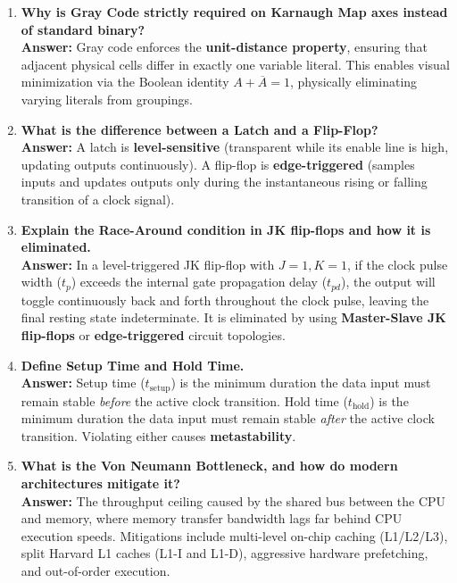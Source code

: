 \begin{enumerate}[label=\bfseries Q\arabic*.]
    \item \textbf{Why is Gray Code strictly required on Karnaugh Map axes instead of standard binary?} \\
    \textbf{Answer:} Gray code enforces the \textbf{unit-distance property}, ensuring that adjacent physical cells differ in exactly one variable literal. This enables visual minimization via the Boolean identity $A + \overline{A} = 1$, physically eliminating varying literals from groupings.

    \item \textbf{What is the difference between a Latch and a Flip-Flop?} \\
    \textbf{Answer:} A latch is \textbf{level-sensitive} (transparent while its enable line is high, updating outputs continuously). A flip-flop is \textbf{edge-triggered} (samples inputs and updates outputs only during the instantaneous rising or falling transition of a clock signal).

    \item \textbf{Explain the Race-Around condition in JK flip-flops and how it is eliminated.} \\
    \textbf{Answer:} In a level-triggered JK flip-flop with $J=1, K=1$, if the clock pulse width ($t_p$) exceeds the internal gate propagation delay ($t_{pd}$), the output will toggle continuously back and forth throughout the clock pulse, leaving the final resting state indeterminate. It is eliminated by using \textbf{Master-Slave JK flip-flops} or \textbf{edge-triggered} circuit topologies.

    \item \textbf{Define Setup Time and Hold Time.} \\
    \textbf{Answer:} Setup time ($t_{\text{setup}}$) is the minimum duration the data input must remain stable \textit{before} the active clock transition. Hold time ($t_{\text{hold}}$) is the minimum duration the data input must remain stable \textit{after} the active clock transition. Violating either causes \textbf{metastability}.

    \item \textbf{What is the Von Neumann Bottleneck, and how do modern architectures mitigate it?} \\
    \textbf{Answer:} The throughput ceiling caused by the shared bus between the CPU and memory, where memory transfer bandwidth lags far behind CPU execution speeds. Mitigations include multi-level on-chip caching (L1/L2/L3), split Harvard L1 caches (L1-I and L1-D), aggressive hardware prefetching, and out-of-order execution.


\end{enumerate}
